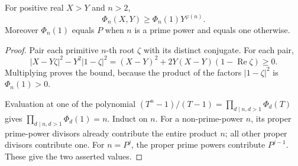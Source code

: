\begin{lemma}
\label{epg-root-pair}
For positive real $X>Y$ and $n>2$,
\[
 \Phi_n(X,Y)\ge\Phi_n(1)Y^{\varphi(n)}.
\]
Moreover $\Phi_n(1)$ equals $P$ when $n$ is a prime power and
equals one otherwise.
\end{lemma}
\begin{proof}
Pair each primitive $n$-th root $\zeta$ with its distinct conjugate.
For each pair,
\[
 |X-Y\zeta|^2-Y^2|1-\zeta|^2
 =(X-Y)^2+2Y(X-Y)(1-\operatorname{Re}\zeta)\ge0.
\]
Multiplying proves the bound, because the product of the factors
$|1-\zeta|^2$ is $\Phi_n(1)>0$.

Evaluation at one of the polynomial
$(T^n-1)/(T-1)=\prod_{d\mid n,d>1}\Phi_d(T)$ gives
$\prod_{d\mid n,d>1}\Phi_d(1)=n$. Induct on $n$. For a
non-prime-power $n$, its proper prime-power divisors already
contribute the entire product $n$; all other proper divisors
contribute one. For $n=P^j$, the proper prime powers contribute
$P^{j-1}$. These give the two asserted values.
\end{proof}

